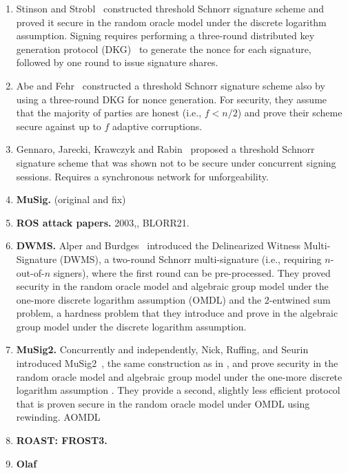 \begin{enumerate}
\item Stinson and Strobl~\cite{StinsonS01} constructed  threshold Schnorr signature scheme and proved it secure in the random oracle model under the discrete logarithm assumption. Signing requires performing a three-round distributed key generation protocol (DKG)~\cite{GennaroJKR07}  to generate the nonce for each signature, followed by one round to issue signature shares. 
\item Abe and Fehr~\cite{AbeF04} constructed a threshold Schnorr signature scheme also by using a three-round DKG for nonce generation.
For security, they assume that the majority of parties are honest (i.e., $f < n/2$) and prove their scheme secure against up to $f$ adaptive corruptions. 
\item Gennaro, Jarecki, Krawczyk and Rabin~\cite{GennaroJKR01}  proposed a threshold Schnorr signature scheme that was shown not to be secure under concurrent signing sessions.  Requires a synchronous network for unforgeability.
\item \textbf{MuSig.} (original and fix)
\item \textbf{ROS attack papers.} 2003,\cite{cryptoeprint:2018/417,DrijversEFKLNS19}, BLORR21. 
\item \textbf{DWMS.} Alper and Burdges~\cite{AlperB21} introduced the Delinearized Witness Multi-Signature (DWMS), a two-round Schnorr multi-signature (i.e., requiring $n$-out-of-$n$ signers), where the first round can be pre-processed.  They proved security in the random oracle model and algebraic group model under the one-more discrete logarithm assumption (OMDL) and the 2-entwined sum problem, a hardness problem that they introduce and prove in the algebraic group model under the discrete logarithm assumption.
\item \textbf{MuSig2.} Concurrently and independently, Nick, Ruffing, and Seurin introduced MuSig2~\cite{NickRS21}, the same construction as in \cite{AlperB21}, and prove security in the random oracle model and algebraic group model under the one-more discrete logarithm assumption .  They provide a second, slightly less efficient protocol that is proven secure in the random oracle model under OMDL using rewinding.
AOMDL
\item \textbf{ROAST: FROST3.} 
\item \textbf{Olaf}
\end{enumerate}

